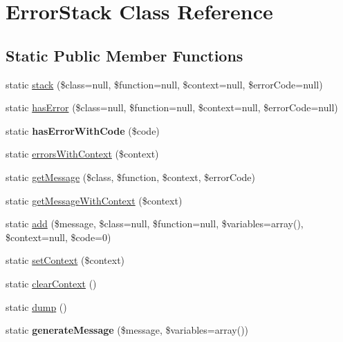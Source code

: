 \hypertarget{classErrorStack}{\section{Error\-Stack Class Reference}
\label{classErrorStack}
}
\subsection*{Static Public Member Functions}
\begin{DoxyCompactItemize}
\item 
static \hyperlink{classErrorStack_a20d6f809dbcb58224f5d4fc55b056660}{stack} (\$class=null, \$function=null, \$context=null, \$error\-Code=null)
\item 
static \hyperlink{classErrorStack_a6c3ccaff191e9e24ad88fec0fa13d892}{has\-Error} (\$class=null, \$function=null, \$context=null, \$error\-Code=null)
\item 
\hypertarget{classErrorStack_a0ee37a5d0c2f944f420cc027bf9043d4}{static {\bfseries has\-Error\-With\-Code} (\$code)}\label{classErrorStack_a0ee37a5d0c2f944f420cc027bf9043d4}

\item 
static \hyperlink{classErrorStack_a9fc1e04e762628613015cf62a055d4aa}{errors\-With\-Context} (\$context)
\item 
static \hyperlink{classErrorStack_a670a1b10810e2c230bbe8dc4cb7eca3f}{get\-Message} (\$class, \$function, \$context, \$error\-Code)
\item 
static \hyperlink{classErrorStack_aa1e47d928ad756d6b8fe20bc726ab32e}{get\-Message\-With\-Context} (\$context)
\item 
static \hyperlink{classErrorStack_ae2ee29b47d837e6d59436469593652f3}{add} (\$message, \$class=null, \$function=null, \$variables=array(), \$context=null, \$code=0)
\item 
static \hyperlink{classErrorStack_ad2333eb215c105c406b97bffb814a13c}{set\-Context} (\$context)
\item 
static \hyperlink{classErrorStack_a239a25d7d6616a65cfae42fb0a68d4ab}{clear\-Context} ()
\item 
static \hyperlink{classErrorStack_ad809b79d98533e74b1fa4cc8e3273e9a}{dump} ()
\item 
\hypertarget{classErrorStack_a140907f6dc51528f612170d866bdcff9}{static {\bfseries generate\-Message} (\$message, \$variables=array())}\label{classErrorStack_a140907f6dc51528f612170d866bdcff9}

\end{DoxyCompactItemize}


